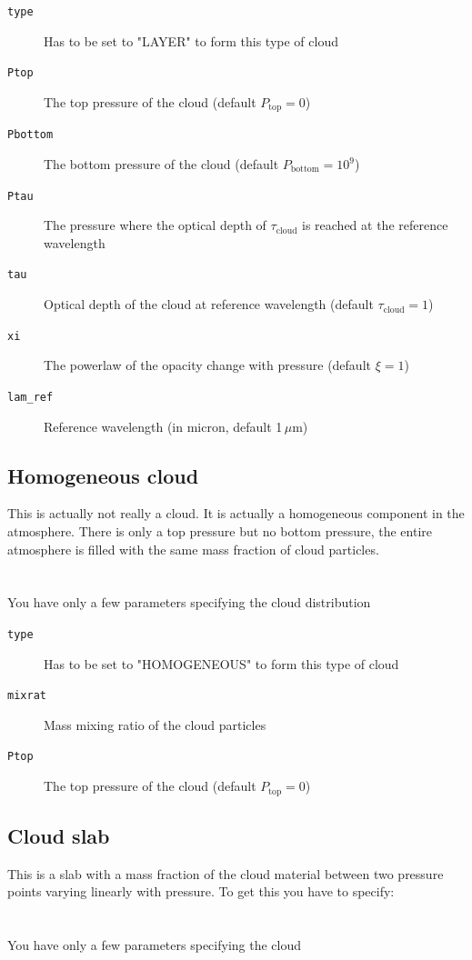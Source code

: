 \documentclass[12pt]{article}
\begin{document}
\begin{description}
\item[\texttt{type}]
Has to be set to "LAYER" to form this type of cloud
\item[\texttt{Ptop}]
The top pressure of the cloud (default $P_\mathrm{top}=0$)
\item[\texttt{Pbottom}]
The bottom pressure of the cloud (default $P_\mathrm{bottom}=10^9$)
\item[\texttt{Ptau}]
The pressure where the optical depth of $\tau_\mathrm{cloud}$ is reached at the reference wavelength
\item[\texttt{tau}]
Optical depth of the cloud at reference wavelength (default $\tau_\mathrm{cloud}=1$)
\item[\texttt{xi}]
The powerlaw of the opacity change with pressure (default $\xi=1$)
\item[\texttt{lam\_ref}]
Reference wavelength (in micron, default 1\,$\mu$m)
\end{description}

\subsection{Homogeneous cloud}

This is actually not really a cloud. It is actually a homogeneous component in the atmosphere. There is only a top pressure but no bottom pressure, the entire atmosphere is filled with the same mass fraction of cloud particles.
\\
\\
\\
You have only a few parameters specifying the cloud distribution

\begin{description}
\item[\texttt{type}]
Has to be set to "HOMOGENEOUS" to form this type of cloud
\item[\texttt{mixrat}]
Mass mixing ratio of the cloud particles
\item[\texttt{Ptop}]
The top pressure of the cloud (default $P_\mathrm{top}=0$)
\end{description}


\subsection{Cloud slab}

This is a slab with a mass fraction of the cloud material between two pressure points varying linearly with pressure. To get this you have to specify:
\\
\\
\\
You have only a few parameters specifying the cloud
\end{document}
